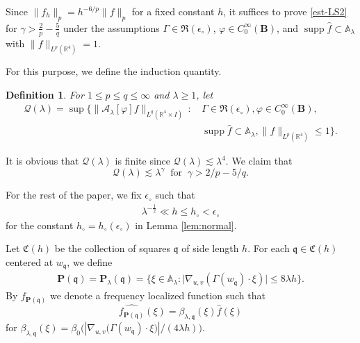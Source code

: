 \documentclass[10pt] %
{amsart}
\theoremstyle{plain}
\newtheorem{defn}[thm]{Definition}
\numberwithin{equation}{section}
\DeclareMathOperator{\supp}{supp}
\newcommand{\fq}{\mathfrak q}
\begin{document}
Since $\|f_{h}\|_p = h^{-6/p} \|f\|_p$ for a fixed constant $h $, it suffices to prove \eqref{est-LS2}  for $\gamma > \frac 2 p -\frac 5 q$ under the assumptions  $\Gamma \in \mathfrak R (\epsilon_\circ)$, $\varphi \in C_0^\infty(\mathbf B)$, and
$\supp \widehat f \subset  \mathbb A_\lambda$ with $\|f\|_{L^p(\mathbb R^4)} =1$. 

For this purpose, we define the induction quantity. 

\begin{defn}
For $1\le p \le q \le \infty$ and
$\lambda \ge 1$, let   
\[ 
\begin{aligned}
\mathscr Q(\lambda) = \sup \big\{ \| \mathcal A_{\lambda}[\varphi]f\|_{L^q(\mathbb R^4\times I)}\, : \, 
& \Gamma \in \mathfrak R (\epsilon_\circ), \varphi \in C_0^\infty (\mathbf B),  \\
& \supp \widehat f \subset \mathbb A_\lambda, \|f\|_{L^p(\mathbb R^4)} \le 1 \big\}.
\end{aligned}
\]
\end{defn}
It is obvious that $\mathscr Q(\lambda)$ is finite since $\mathscr Q(\lambda)\lesssim \lambda^4$. 
We claim that 
\begin{equation}\label{qlambda}
\mathscr Q(\lambda)\lesssim\lambda^{\gamma} ~\text{ for }~ \gamma > 2/ p - 5/ q .  
\end{equation}





For the rest of the paper, we fix $\epsilon_\circ$ such that
\begin{align}\label{ordering}
\lambda^{-\frac12}  \ll h \le h_\circ <\epsilon_\circ
\end{align}
for the constant  $h_\circ=h_\circ(\epsilon_\circ)$  in Lemma \ref{lem:normal}.









Let $\mathfrak C(h)$ be the collection of squares $\fq$ of side length $h$. 
For each $\fq\in \mathfrak C(h)$ centered at $w_\fq$, we define
\begin{align}\label{rectangle1}
\mathbf P(\fq) = \mathbf P_{\lambda}(\fq) = \big\{\xi\in \mathbb A_\lambda: \big|\nabla_{u,v}(\Gamma(w_{\fq})\cdot\xi ) \big| \le 8  \lambda h \big\}. 
\end{align}  
By $f_{\mathbf P(\fq)}$ we denote a frequency localized function  such that 
\[  
\widehat{f_{\mathbf P(\fq)}}(\xi) =  \beta_{\lambda,\fq}(\xi)  \widehat f(\xi)
\]
for $ \beta_{\lambda,\fq} (\xi) = \beta_0 \big(  |\nabla_{u,v}\big(\Gamma(w_{\fq})\cdot\xi\big)| / ( 4\lambda h ) \big) $.
\end{document}
